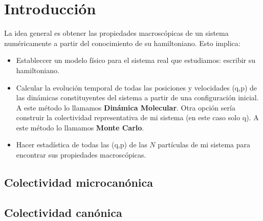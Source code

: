 
\chapter{Introducción}

La idea general es obtener las propiedades macroscópicas de un sistema numéricamente a partir del conocimiento de su hamiltoniano. Esto implica:

\begin{itemize}
    \item Estableccer un modelo físico para el sistema real que estudiamos: escribir su hamiltoniano.
    \item Calcular la evolución temporal de todas las posiciones y velocidades (q,p) de las dinámicas constituyentes del sistema a partir de una configuración inicial. A este método lo llamamos \textbf{Dinámica Molecular}. Otra opción sería construir la colectividad representativa de mi sistema (en este caso solo q). A este método lo llamamos \textbf{Monte Carlo}.
    \item Hacer estadística de todas las (q,p) de las $N$ partículas de mi sistema para encontrar sus propiedades macroscópicas.
\end{itemize}

\section{Colectividad microcanónica}


\section{Colectividad canónica}